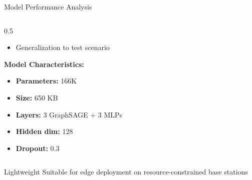 \documentclass[aspectratio=169]{beamer}
\begin{document}
\begin{frame}{Model Performance Analysis}
\begin{columns}
\begin{column}{0.5\textwidth}
\begin{itemize}
                \item Generalization to test scenario
            \end{itemize}
            
           
            
            \textbf{Model Characteristics:}
            \begin{itemize}
                \item \textbf{Parameters:} 166K
                \item \textbf{Size:} 650 KB
                \item \textbf{Layers:} 3 GraphSAGE + 3 MLPs
                \item \textbf{Hidden dim:} 128
                \item \textbf{Dropout:} 0.3
            \end{itemize}
            \end{column}
    \end{columns}
            
            \begin{alertblock}{Lightweight}
                Suitable for edge deployment on resource-constrained base stations
            \end{alertblock}
        
\end{frame}
\end{document}
